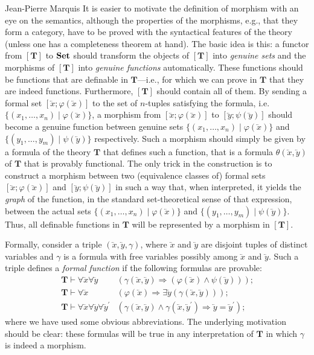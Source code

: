 \begin{artengenv}{Jean-Pierre Marquis}
It is easier to motivate the definition of morphism with an eye on the semantics, although the properties of the morphisms, e.g., that they form a category, have to be proved with the syntactical features of the theory (unless one has a completeness theorem at hand). The basic idea is this: a functor from \( [\mathbf{T}] \) to \( \mathbf{Set} \) should transform the objects of \( [\mathbf{T}] \) into \emph{genuine sets} and the morphisms of \( [\mathbf{T}] \) into \emph{genuine functions} automatically. These functions should be functions that are definable in \( \mathbf{T} \)---i.e., for which we can prove in \( \mathbf{T} \) that they are indeed functions. Furthermore, \( [\mathbf{T}] \) should contain all of them. By sending a formal set \( [\lvec{x}; \varphi(\lvec{x})] \) to the set of \( n \)-tuples satisfying the formula, i.e. \( \{ (x_1, \dots, x_n) \mid \varphi(\lvec{x}) \} \), a morphism from \( [\lvec{x}; \varphi(\lvec{x})] \) to \( [\lvec{y}; \psi(\lvec{y})] \) should become a genuine function between genuine sets \( \{ (x_1, \dots, x_n) \mid \varphi(\lvec{x}) \} \) and \( \{ (y_1, \dots, y_m) \mid \psi(\lvec{y}) \} \) respectively. Such a morphism should simply be given by a formula of the theory \( \mathbf{T} \) that defines such a function, that is a formula \( \theta(\lvec{x}, \lvec{y}) \) of \( \mathbf{T} \) that is provably functional. The only trick in the construction is to construct a morphism between two (equivalence classes of) formal sets \( [\lvec{x}; \varphi(\lvec{x})] \) and \( [\lvec{y}; \psi(\lvec{y})] \) in such a way that, when interpreted, it yields the \textit{graph} of the function, in the standard set-theoretical sense of that expression, between the actual sets \( \{ (x_1, \dots, x_n) \mid \varphi(\lvec{x}) \} \) and \( \{ (y_1, \dots, y_m) \mid \psi(\lvec{y}) \} \). Thus, all definable functions in \( \mathbf{T} \) will be represented by a morphism in \( \mathbf{[T]} \).


Formally, consider a triple \( (\lvec{x}, \lvec{y}, \gamma) \), where \( \lvec{x} \) and \( \lvec{y} \) are disjoint tuples of distinct variables and \( \gamma \) is a formula with free variables possibly among \( \lvec{x} \) and \( \lvec{y} \). Such a triple defines a \emph{formal function} if the following formulas are provable:
%
\begin{align*}
\mathbf{T} \vdash \forall \lvec{x} \forall \lvec{y} & (\gamma(\lvec{x}, \lvec{y}) \Rightarrow (\varphi(\lvec{x}) \land \psi(\lvec{y}))) \text{;} \\
\mathbf{T} \vdash \forall \lvec{x} & (\varphi(\lvec{x}) \Rightarrow \exists \lvec{y} (\gamma (\lvec{x}, \lvec{y}))) \text{;} \\
\mathbf{T} \vdash \forall \lvec{x} \forall \lvec{y} \forall \lvec{y}^{\prime} & ( \gamma(\lvec{x}, \lvec{y}) \land \gamma(\lvec{x}, \lvec{y}^{\prime}) \Rightarrow \lvec{y} = \lvec{y}^{\prime}) \text{;}
\end{align*}
%
where we have used some obvious abbreviations. The underlying motivation should be clear: these formulas will be true in any interpretation of \( \mathbf{T} \) in which \( \gamma \) is indeed a morphism.


\end{artengenv}
